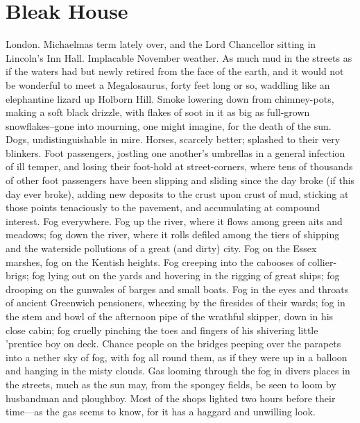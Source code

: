 \documentclass[a4paper]{article}
\begin{document}
\section{Bleak House}
London. Michaelmas term lately over, and the Lord Chancellor sitting in Lincoln’s
Inn Hall. Implacable November weather. As much mud in the streets as if the
waters had but newly retired from the face of the earth, and it would not be
wonderful to meet a Megalosaurus, forty feet long or so, waddling like an
elephantine lizard up Holborn Hill. Smoke lowering down from chimney-pots,
making a soft black drizzle, with flakes of soot in it as big as full-grown
snowflakes–gone into mourning, one might imagine, for the death of the sun.
Dogs, undistinguishable in mire. Horses, scarcely better; splashed to their very
blinkers. Foot passengers, jostling one another’s umbrellas in a general infection of
ill temper, and losing their foot-hold at street-corners, where tens of thousands of
other foot passengers have been slipping and sliding since the day broke (if this day
ever broke), adding new deposits to the crust upon crust of mud, sticking at those
points tenaciously to the pavement, and accumulating at compound interest.
Fog everywhere. Fog up the river, where it flows among green aits and meadows;
fog down the river, where it rolls defiled among the tiers of shipping and the
waterside pollutions of a great (and dirty) city. Fog on the Essex marshes, fog on
the Kentish heights. Fog creeping into the cabooses of collier-brigs; fog lying out on
the yards and hovering in the rigging of great ships; fog drooping on the gunwales
of barges and small boats. Fog in the eyes and throats of ancient Greenwich
pensioners, wheezing by the firesides of their wards; fog in the stem and bowl of the
afternoon pipe of the wrathful skipper, down in his close cabin; fog cruelly
pinching the toes and fingers of his shivering little ’prentice boy on deck. Chance
people on the bridges peeping over the parapets into a nether sky of fog, with fog all
round them, as if they were up in a balloon and hanging in the misty clouds.
Gas looming through the fog in divers places in the streets, much as the sun may,
from the spongey fields, be seen to loom by husbandman and ploughboy. Most of
the shops lighted two hours before their time—as the gas seems to know, for it has a
haggard and unwilling look.
\end{document}
